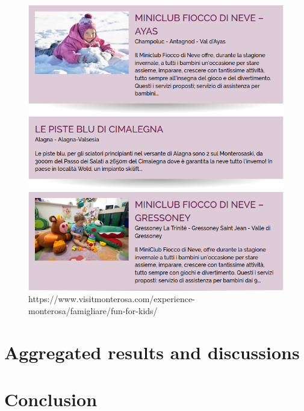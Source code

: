 \documentclass[a4paper, 11pt, parskip=half, headsepline]{scrreprt}
\begin{document}
\begin{figure}[H]
	\centering
	\begin{minipage}[t]{0.5\textwidth}
		\centering
		\includegraphics[width=1\linewidth, keepaspectratio]{103-consistency-missing-images}
		\caption{https://www.visitmonterosa.com/experience-monterosa/famigliare/fun-for-kids/}
		\label{fig:consistency-03}
	\end{minipage} 
\end{figure}


\chapter{Aggregated results and discussions}


\chapter{Conclusion}

\end{document}
